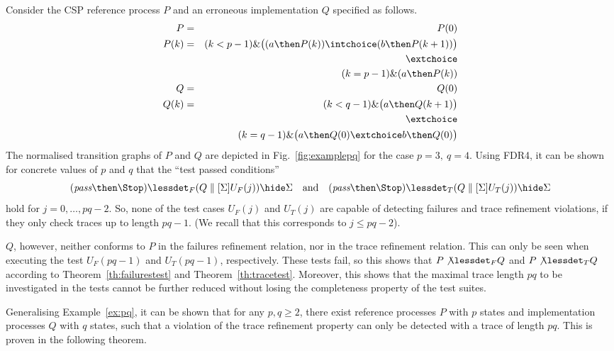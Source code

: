 \begin{example}\label{ex:pq}
Consider the CSP reference process $P$ and an erroneous implementation $Q$
specified as follows.
%
\begin{eqnarray*}
P & = &  P(0)
\\
P(k) & = & (k < p-1) \& \big( (a \then P(k)) \intchoice ( b \then P(k+1))\big)
\\ & & \extchoice
\\ & & (k = p-1) \& (a \then P(k))
\\
Q & = & Q(0)
\\
Q(k) & = & (k < q-1) \& \big( a \then Q(k+1)    \big)
\\ & & \extchoice
\\ & & ( k = q-1)\& \big( a\then Q(0) \extchoice b\then Q(0)  \big)
\end{eqnarray*}
%
The normalised transition graphs of $P$ and $Q$ are depicted in
Fig.~\ref{fig:examplepq} for the case $p=3,\ q=4$. Using FDR4, it can be
shown for concrete values of $p$ and $q$ that the  ``test passed conditions''
\[
(\epass\then\Stop) \lessdet_F (Q\parallel[\Sigma] U_F(j))\hide \Sigma
\quad
\mathrm{and}
\quad
(\epass\then\Stop) \lessdet_T (Q\parallel[\Sigma] U_T(j))\hide \Sigma
\]
hold for $j = 0,\dots,pq-2$. So, none of the test cases $U_F(j)$ and $U_T(j)$
are capable of detecting failures and trace refinement violations, if they
only check traces up to length $pq-1$. (We recall that this corresponds to
$j\le pq-2$).

$Q$, however, neither conforms to $P$ in the failures refinement relation,
nor in the trace refinement relation. This can only be seen when executing
the test $U_F(pq-1)$ and $U_T(pq-1)$, respectively. These tests fail, so this
shows that $P\not\lessdet_F Q$ and $P\not\lessdet_T Q$ according to
Theorem~\ref{th:failurestest} and Theorem~\ref{th:tracetest}. Moreover, this
shows that the maximal trace length $pq$ to be investigated in the tests
cannot be further reduced without losing the completeness property of the
test suites. \xbox
\end{example}
%
Generalising Example~\ref{ex:pq}, it can be shown that for any $p,q \geq 2$,
there exist reference processes $P$ with $p$ states and
implementation processes $Q$ with $q$ states, such that a violation of the
trace refinement property can only be detected with a trace of length $pq$.
This is proven in the following
theorem. %

